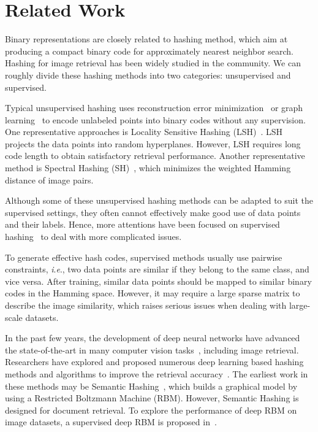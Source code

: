\documentclass[runningheads]{llncs}
\newcommand{\ie}{\textit{i}.\textit{e}.}
\begin{document}
\section{Related Work}

Binary representations are closely related to hashing method, which aim at producing a compact binary code for approximately nearest neighbor search. Hashing for image retrieval has been widely studied in the community. We can roughly divide these hashing methods into two categories: unsupervised and supervised.

Typical unsupervised hashing uses reconstruction error minimization~\cite{Gionis99VLDB_LSH,Gong11CVPR_r1,Jegou11PAMI_r2} or graph learning~\cite{Weiss14NIPS_r3,Liu11ICML_r4,Liu14NIPS_r5} to encode unlabeled points into binary codes without any supervision. One representative approaches is Locality Sensitive Hashing (LSH)~\cite{Gionis99VLDB_LSH}. LSH projects the data points into random hyperplanes. However, LSH requires long code length to obtain satisfactory retrieval performance. Another representative method is Spectral Hashing (SH)~\cite{Weiss14NIPS_r3}, which minimizes the weighted Hamming distance of image pairs. 

Although some of these unsupervised hashing methods can be adapted to suit the supervised settings, they often cannot effectively make good use of data points and their labels. Hence, more attentions have been focused on supervised hashing~\cite{Liu12CVPR_r6,Norouzi11ICML_r7,Shen15CVPR_r8} to deal with more complicated issues.

To generate effective hash codes, supervised methods usually use pairwise constraints, \ie, two data points are similar if they belong to the same class, and vice versa. After training, similar data points should be mapped to similar binary codes in the Hamming space. However, it may require a large sparse matrix to describe the image similarity, which raises serious issues when dealing with large-scale datasets.

In the past few years, the development of deep neural networks have advanced the state-of-the-art in many computer vision tasks~\cite{AlexNet,ResNet}, including image retrieval. Researchers have explored and proposed numerous deep learning based hashing methods and algorithms to improve the retrieval accuracy~\cite{Salakhutdinov09_r9,Torralba08CVPR_r10,Xia14AAAI_r11,Liu16CVPR_r12,Lin15CVPRW_r13,Li17ACMMM_r14,Cao17ICCV_r15}. The earliest work in these methods may be Semantic Hashing~\cite{Salakhutdinov09_r9}, which  builds a graphical model by using a Restricted Boltzmann Machine (RBM). However, Semantic Hashing is designed for document retrieval. To explore the performance of deep RBM on image datasets, a supervised deep RBM is proposed in~\cite{Torralba08CVPR_r10}.
\end{document}
